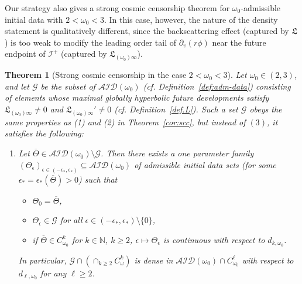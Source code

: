\documentclass[10pt, reqno]{amsart}
\newtheorem{theorem}{Theorem}[section]
\theoremstyle{definition}
\theoremstyle{remark}
\numberwithin{equation}{section}
\newcommand{\rd}{\partial}
\newcommand{\0}{\emptyset}
\newcommand{\eps}{\epsilon}
\newcommand{\Tht}{\Theta}
\newcommand{\omg}{\omega}
\newcommand{\calA}{\mathcal A}
\newcommand{\calD}{\mathcal D}
\newcommand{\calG}{\mathcal G}
\newcommand{\calI}{\mathcal I}
\newcommand{\NI}{\calI^{+}}						%
\begin{document}
Our strategy also gives a strong cosmic censorship theorem for $\omg_{0}$-admissible initial data with $2 < \omg_{0} < 3$. In this case, however, the nature of the density statement is qualitatively different, since the backscattering effect (captured by $\mathfrak{L}$) is too weak to modify the leading order tail of $\rd_{v}(r \phi)$ near the future endpoint of $\NI$ (captured by $\mathfrak{L}_{(\omg_{0}) \infty}$).

\begin{theorem}[Strong cosmic censorship in the case $2 < \omg_{0} < 3$]\label{cor:scc.small.omg}
Let $\omg_{0} \in (2,3)$, and let $\calG$ be the subset of $\calA \calI \calD(\omg_{0})$ (cf. Definition~\ref{def:adm-data}) consisting of elements whose maximal globally hyperbolic future developments satisfy $\mathfrak{L}_{(\omg_{0}) \infty} \neq 0$ and $\mathfrak{L}_{(\omg_{0}) \infty}' \neq 0$ (cf. Definition~\ref{def.L}). Such a set $\calG$ obeys the same properties as (1) and (2) in Theorem~\ref{cor:scc}, but instead of $(3)$, it satisfies the following:
{\it \begin{enumerate}
\item [(3')] Let $\overline{\Tht} \in \calA \calI \calD (\omg_0) \setminus \calG$. Then there exists a one parameter family $(\Tht_{\eps})_{\eps \in (-\eps_{\ast}, \eps_{\ast})} \subseteq \calA \calI \calD (\omg_0)$ of admissible initial data sets (for some $\eps_{\ast} = \eps_{\ast}(\overline{\Tht}) > 0$) such that 
\begin{itemize}
\item $\Tht_{0} = \overline{\Tht}$, 
\item $\Tht_{\eps} \in \calG$ for all $\eps \in (-\eps_{\ast}, \eps_{\ast}) \setminus \{0\}$,
\item if $\overline{\Theta}\in C^k_{\omg_0}$ for $k\in\mathbb N$, $k\geq 2$, $\eps \mapsto \Tht_{\eps}$ is continuous with respect to $d_{k, \omg_{0}}$.
\end{itemize} 
In particular, $\calG\cap \left(\cap_{k\geq 2} C^k_{\omg}\right)$ is dense in $\calA \calI \calD (\omg_0)\cap C^\ell_{\omg_0}$ with respect to $d_{\ell, \omg_0}$ for any $\ell\geq 2$.
\end{enumerate}
}
\end{theorem}
\end{document}
